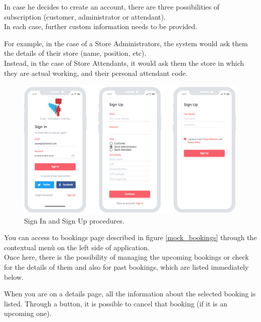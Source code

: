 \documentclass[table, 12pt]{article}
\begin{document}
In case he decides to create an account, there are three possibilities of subscription (customer, administrator or attendant).\\
In each case, further custom information needs to be provided.

For example, in the case of a Store Administrators, the system would ask them the details of their store (name, position, etc).\\
Instead, in the case of Store Attendants, it would ask them the store in which they are actual working, and their personal attendant code.
\begin{figure}[H]
    \begin{center}
        \includegraphics[width=\textwidth]{assets/Mockups/mock_sign_in_sign_up.png}
        \caption{Sign In and Sign Up procedures.}
        \label{mock_sign_in_up}
    \end{center}
\end{figure}

You can access to bookings page described in figure \ref{mock_bookings} through the contextual menù on the left side of application.\\
Once here, there is the possibility of managing the upcoming bookings or check for the details of them and also for past bookings, which are listed immediately below.

When you are on a details page, all the information about the selected booking is listed. Through a button, it is possible to cancel that booking (if it is an upcoming one).
\end{document}
